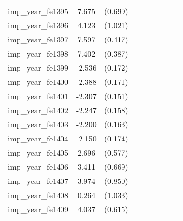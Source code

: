 {\begin{tabular}{l*{4}{cc}}
imp\_year\_fe1395&    7.675\sym{***}&  (0.699)&                  &         &                  &         &                  &         \\
imp\_year\_fe1396&    4.123\sym{***}&  (1.021)&                  &         &                  &         &                  &         \\
imp\_year\_fe1397&    7.597\sym{***}&  (0.417)&                  &         &                  &         &                  &         \\
imp\_year\_fe1398&    7.402\sym{***}&  (0.387)&                  &         &                  &         &                  &         \\
imp\_year\_fe1399&   -2.536\sym{***}&  (0.172)&                  &         &                  &         &                  &         \\
imp\_year\_fe1400&   -2.388\sym{***}&  (0.171)&                  &         &                  &         &                  &         \\
imp\_year\_fe1401&   -2.307\sym{***}&  (0.151)&                  &         &                  &         &                  &         \\
imp\_year\_fe1402&   -2.247\sym{***}&  (0.158)&                  &         &                  &         &                  &         \\
imp\_year\_fe1403&   -2.200\sym{***}&  (0.163)&                  &         &                  &         &                  &         \\
imp\_year\_fe1404&   -2.150\sym{***}&  (0.174)&                  &         &                  &         &                  &         \\
imp\_year\_fe1405&    2.696\sym{***}&  (0.577)&                  &         &                  &         &                  &         \\
imp\_year\_fe1406&    3.411\sym{***}&  (0.669)&                  &         &                  &         &                  &         \\
imp\_year\_fe1407&    3.974\sym{***}&  (0.850)&                  &         &                  &         &                  &         \\
imp\_year\_fe1408&    0.264         &  (1.033)&                  &         &                  &         &                  &         \\
imp\_year\_fe1409&    4.037\sym{***}&  (0.615)&                  &         &                  &         &                  &         \\

\end{tabular}}
